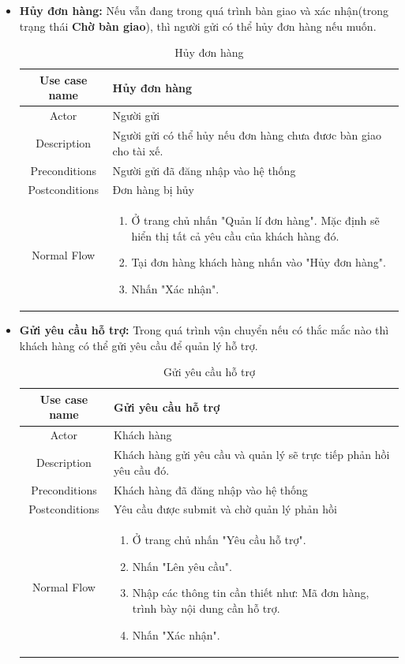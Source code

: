 \begin{itemize}
\begin{itemize}
			\item \textbf{Hủy đơn hàng:} Nếu vẫn đang trong quá trình bàn giao và xác nhận(trong trạng thái \textbf{Chờ bàn giao}), thì người gửi có thể hủy đơn hàng nếu muốn.
			
			
			\begin{table}[H]
				\centering\begin{tabular}{|c|m{25em}|}
					\hline 
					Use case name & Hủy đơn hàng\\ 
					\hline 
					Actor & Người gửi \\ 
					\hline
					Description & Người gửi có thể hủy nếu đơn hàng chưa đươc bàn giao cho tài xế. \\
					\hline 
					Preconditions & Người gửi đã đăng nhập vào hệ thống \\
					\hline
					Postconditions & Đơn hàng bị hủy \\
					\hline
					Normal Flow & \begin{enumerate}
						\item Ở trang chủ nhấn "Quản lí đơn hàng". Mặc định sẽ hiển thị tất cả yêu cầu của khách hàng đó.
						\item Tại đơn hàng khách hàng nhấn vào "Hủy đơn hàng".
						\item Nhấn "Xác nhận".
					\end{enumerate}
					\\
					\hline
				\end{tabular}
				\caption{Hủy đơn hàng}
			\end{table}
			
			\item \textbf{Gửi yêu cầu hỗ trợ:} Trong quá trình vận chuyển nếu có thắc mắc nào thì khách hàng có thể gửi yêu cầu để quản lý hỗ trợ.
			
			\begin{table}[H]
				\centering\begin{tabular}{|c|m{25em}|}
					\hline 
					Use case name & Gửi yêu cầu hỗ trợ\\ 
					\hline 
					Actor & Khách hàng \\ 
					\hline
					Description & Khách hàng gửi yêu cầu và quản lý sẽ trực tiếp phản hồi yêu cầu đó. \\
					\hline 
					Preconditions & Khách hàng đã đăng nhập vào hệ thống \\
					\hline
					Postconditions & Yêu cầu được submit và chờ quản lý phản hồi \\
					\hline
					Normal Flow & \begin{enumerate}
						\item Ở trang chủ nhấn "Yêu cầu hỗ trợ".
						\item Nhấn "Lên yêu cầu".
						\item Nhập các thông tin cần thiết như: Mã đơn hàng, trình bày nội dung cần hỗ trợ.
						\item Nhấn "Xác nhận".
					\end{enumerate}
					\\
					\hline
				\end{tabular}
				\caption{Gửi yêu cầu hỗ trợ}
			\end{table}
		

\end{itemize}
\end{itemize}
